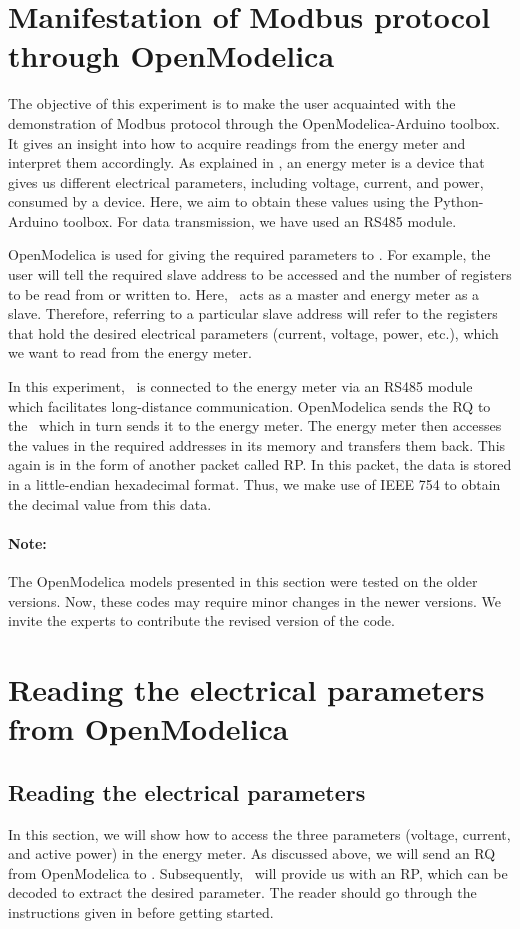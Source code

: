 
\section{Manifestation of Modbus protocol through OpenModelica}
The objective of this experiment is to make the user acquainted with
the demonstration of Modbus protocol through the OpenModelica-Arduino toolbox.
It gives an insight into how to acquire readings from the energy meter and interpret them accordingly. As explained in ,
an energy meter is a device that gives us different electrical parameters, including voltage, current, and power, consumed by a device. Here, we aim to obtain these values using the Python-Arduino toolbox. For data transmission, we have used an RS485 module.

OpenModelica is used for giving the required parameters to \arduino. For
example, the user will tell the required slave address to be accessed
and the number of registers to be read from or written to. Here,
\arduino\ acts as a master and energy meter as a slave. Therefore,
referring to a particular slave address will refer to the registers
that hold the desired electrical parameters (current, voltage, power, etc.), which we want to read from the energy meter.

In this experiment, \arduino\ is connected to the energy meter via an RS485 module which facilitates long-distance communication.
OpenModelica sends the RQ to the \arduino\, which in turn sends it to the
energy meter. The energy meter then accesses the values in the
required addresses in its memory and transfers them back. This again
is in the form of another packet called RP. In this packet, the data is stored in a little-endian hexadecimal format. Thus, we make use of IEEE 754 to obtain the decimal value from this data.

\paragraph{Note: } The OpenModelica models presented in this section were tested on the older versions. Now, these codes may require minor changes in
the newer versions. We invite the experts to contribute the revised version of the code.


\section{Reading the electrical parameters from OpenModelica}
\subsection{Reading the electrical parameters}
In this section, we will show how to access the three parameters (voltage, current, and active power) in the energy meter. As discussed above, we will send an RQ from OpenModelica to \arduino. Subsequently, \arduino\ will provide us with an RP, which can be decoded to extract the desired parameter. The reader should go through the instructions given in  before getting started.

